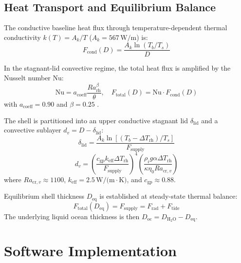 \documentclass[10pt,twocolumn,letterpaper]{article}
\begin{document}
\subsection{Heat Transport and Equilibrium Balance}
The conductive baseline heat flux through temperature-dependent thermal conductivity $k(T) = A_k / T$ ($A_k = 567\,\text{W/m}$) is:
\begin{equation}
F_{\mathrm{cond}}(D) = \frac{A_k \ln(T_b / T_s)}{D}
\label{eq:f_cond}
\end{equation}

In the stagnant-lid convective regime, the total heat flux is amplified by the Nusselt number $\mathrm{Nu}$:
\begin{equation}
\mathrm{Nu} = a_{\mathrm{coeff}} \frac{Ra_{\mathrm{rh}}^\beta}{\theta}, \quad F_{\mathrm{total}}(D) = \mathrm{Nu} \cdot F_{\mathrm{cond}}(D)
\label{eq:nusselt}
\end{equation}
with $a_{\mathrm{coeff}} = 0.90$ and $\beta = 0.25$ \cite{grasset1998thermal,spohn2003oceans}.

The shell is partitioned into an upper conductive stagnant lid $\delta_{\mathrm{lid}}$ and a convective sublayer $d_v = D - \delta_{\mathrm{lid}}$:
\begin{equation}
\delta_{\mathrm{lid}} = \frac{A_k \ln\left[(T_b - \Delta T_{\mathrm{rh}})/T_s\right]}{F_{\mathrm{supply}}}
\label{eq:lid}
\end{equation}
\begin{equation}
d_v = \left( \frac{c_{\mathrm{gp}} k_{\mathrm{eff}} \Delta T_{\mathrm{rh}}}{F_{\mathrm{supply}}} \right)^4 \left( \frac{\rho_i g \alpha \Delta T_{\mathrm{rh}}}{\kappa \eta_0 Ra_{\mathrm{cr},v}} \right)
\label{eq:sublayer}
\end{equation}
where $Ra_{\mathrm{cr},v} \approx 1100$, $k_{\mathrm{eff}} = 2.5\,\text{W/(m}\cdot\text{K)}$, and $c_{\mathrm{gp}} \approx 0.88$.

Equilibrium shell thickness $D_{\mathrm{eq}}$ is established at steady-state thermal balance:
\begin{equation}
F_{\mathrm{total}}(D_{\mathrm{eq}}) = F_{\mathrm{supply}} = F_{\mathrm{rad}} + F_{\mathrm{tide}}
\label{eq:equilibrium}
\end{equation}
The underlying liquid ocean thickness is then $D_{\mathrm{oc}} = D_{\mathrm{H}_2\mathrm{O}} - D_{\mathrm{eq}}$.

\section{Software Implementation}
\end{document}
